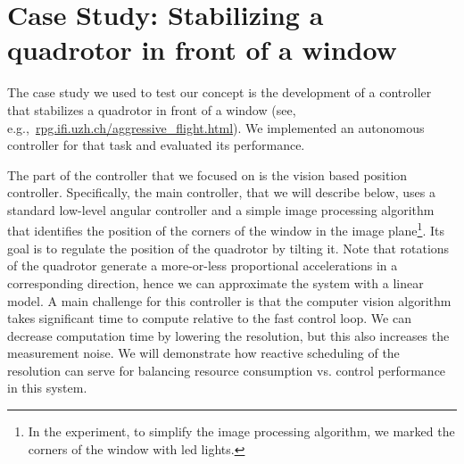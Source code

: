 \documentclass{sig-alternate-ipsn13}
\begin{document}
\section{Case Study: Stabilizing a quadrotor in front of a window}
\label{sec:caseStady}

The case study we used to test our concept is the development of a controller that stabilizes a quadrotor in front of a window (see, e.g.,~\url{rpg.ifi.uzh.ch/aggressive_flight.html}).
We implemented an autonomous controller for that task and evaluated its performance.

The part of the controller that we focused on is the vision based position controller. Specifically, the main controller, that we will describe below, uses a standard low-level angular controller and a simple image processing algorithm that identifies the position of the corners of the window in the image plane\footnote{In the experiment, to simplify the image processing algorithm, we marked the corners of the window with led lights.}. Its goal is to regulate the position of the quadrotor by tilting it. Note that rotations of the quadrotor generate a more-or-less proportional accelerations in a corresponding direction, hence we can approximate the system with a linear model. A main challenge for this controller is that the computer vision algorithm takes significant time to compute relative to the fast control loop. We can decrease computation time by lowering the resolution, but this also increases the measurement noise. We will demonstrate how reactive scheduling of the resolution can serve for balancing resource consumption vs. control performance in this system.
\end{document}
